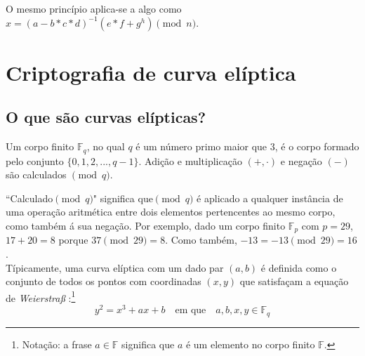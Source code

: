 O mesmo princípio aplica-se a algo como $x = (a-b*c*d)^{-1} (e*f+g^{h}) \pmod n$.
\iffalse
\footnote{The modulus of large numbers can exploit modular equations. It turns out $254 \pmod {13} \equiv 2*10*10 + 5*10 + 4 \equiv (((2)*10 + 5)*10 + 4) \pmod {13}$. An algorithm for $a \pmod n$ when $a > n$ is:
\begin{enumerate}
	\item Define $A \rightarrow [a_{decimal}]$; $r = 0$
	\item For $i = A_{size} - 1,...,0$
	\begin{enumerate}
		\item $r = (r*10 + A[i]) \pmod n$
	\end{enumerate}
	\item Use the final $r$ as result.
\end{enumerate}}
\fi


\section{Criptografia de curva elíptica}
\label{EllipticCurveCryptography}


\subsection{O que são curvas elípticas?}
\label{elliptic_curves_section}

Um corpo finito \(\mathbb{F}_q\), no qual \(q\) é um número primo maior que 3, é o corpo formado pelo conjunto \(\{0, 1, 2, ..., q-1\}\). 
Adição e multiplicação \((+,  \cdot)\) e negação $(-)$ são calculados \( \pmod q\).

``Calculado\( \pmod q\)" significa que\( \pmod q\) é aplicado a qualquer instância de uma operação aritmética entre dois elementos pertencentes ao mesmo corpo, como também á sua negação. Por exemplo, dado um corpo finito \(\mathbb{F}_p\) com $p = 29$, $17+20=8$ porque $37 \pmod{29} = 8$. Como também, $-13 = -13 \pmod{29} = 16$.\\

Típicamente, uma curva elíptica com um dado par $(a,b)$ é definida como o conjunto de todos os pontos com coordinadas \((x, y)\) que satisfaçam a equação de {\em Weierstraß} \cite{Hankerson:2003:GEC:940321}:\footnote{\label{notation1}Notação: a frase $a \in \mathbb{F}$ significa que $a$ é um elemento no corpo finito $\mathbb{F}$.}\vspace{.175cm}
\[y^2 = x^3 + a x + b \quad \textrm{em que} \quad a, b, x, y \in \mathbb{F}_q\]

